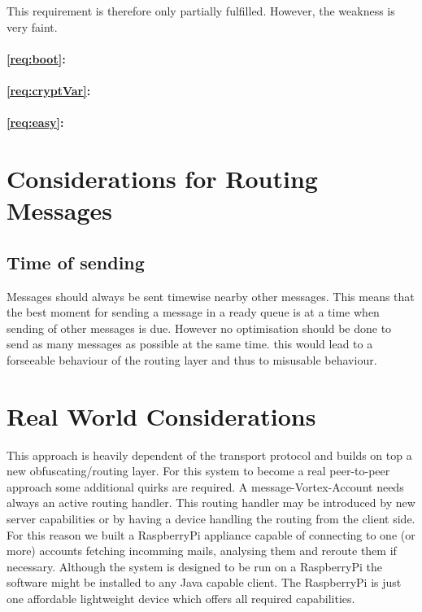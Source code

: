 This requirement is therefore only partially fulfilled. However, the weakness is very faint.

\paragraph*{\ref{req:boot}:} 

\paragraph*{\ref{req:cryptVar}:} 


\paragraph*{\ref{req:easy}:}


\section{Considerations for Routing Messages}
\subsection{Time of sending}
Messages should always be sent timewise nearby other messages. This means that the best moment for sending a message in a ready queue is at a time when sending of other messages is due. However no optimisation should be done to send as many messages as possible at the same time. this would lead to a forseeable behaviour of the routing layer and thus to misusable behaviour.

\section{Real World Considerations}
This approach is heavily dependent of the transport protocol and builds on top a new obfuscating/routing layer. For this system to become a real peer-to-peer approach some additional quirks are required. A message-Vortex-Account needs always an active routing handler. This routing handler may be introduced by new server capabilities or by having a device handling the routing from the client side. For this reason we built a RaspberryPi appliance capable of connecting to one (or more) accounts fetching incomming mails, analysing them and reroute them if necessary. Although the system is designed to be run on a RaspberryPi the software might be installed to any Java capable client. The RaspberryPi is just one affordable lightweight device which offers all required capabilities.

